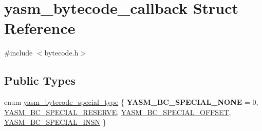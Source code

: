\hypertarget{structyasm__bytecode__callback}{\section{yasm\-\_\-bytecode\-\_\-callback Struct Reference}
\label{structyasm__bytecode__callback}
}


{\ttfamily \#include $<$bytecode.\-h$>$}

\subsection*{Public Types}
\begin{DoxyCompactItemize}
\item 
enum \hyperlink{structyasm__bytecode__callback_a872481e79c8510c5b8559f74599b4e20}{yasm\-\_\-bytecode\-\_\-special\-\_\-type} \{ {\bfseries Y\-A\-S\-M\-\_\-\-B\-C\-\_\-\-S\-P\-E\-C\-I\-A\-L\-\_\-\-N\-O\-N\-E} = 0, 
\hyperlink{structyasm__bytecode__callback_a872481e79c8510c5b8559f74599b4e20a48311d85beeff571a70ae80c1932c01b}{Y\-A\-S\-M\-\_\-\-B\-C\-\_\-\-S\-P\-E\-C\-I\-A\-L\-\_\-\-R\-E\-S\-E\-R\-V\-E}, 
\hyperlink{structyasm__bytecode__callback_a872481e79c8510c5b8559f74599b4e20a054b54d69dcf78ccaf83c27cafa37132}{Y\-A\-S\-M\-\_\-\-B\-C\-\_\-\-S\-P\-E\-C\-I\-A\-L\-\_\-\-O\-F\-F\-S\-E\-T}, 
\hyperlink{structyasm__bytecode__callback_a872481e79c8510c5b8559f74599b4e20a94aea3a71f96763041fc6f6f4b5fe45b}{Y\-A\-S\-M\-\_\-\-B\-C\-\_\-\-S\-P\-E\-C\-I\-A\-L\-\_\-\-I\-N\-S\-N}
 \}
\end{DoxyCompactItemize}
